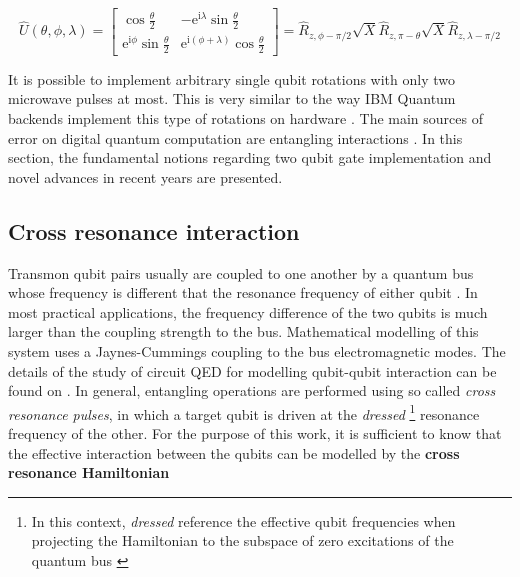   \begin{equation}
    \hat{U}(\theta, \phi, \lambda) = \begin{bmatrix}
      \cos{\frac{\theta}{2}} & -\mathrm{e}^{\mathrm{i}\lambda}\sin{\frac{\theta}{2}} \\
      \mathrm{e}^{\mathrm{i}\phi}\sin{\frac{\theta}{2}} & \mathrm{e}^{\mathrm{i}(\phi+\lambda)}\cos{\frac{\theta}{2}}
    \end{bmatrix}= \hat{R}_{z, \phi-\pi/2} \sqrt{X} \hat{R}_{z, \pi-\theta} \sqrt{X} \hat{R}_{z, \lambda-\pi/2} 
    \label{eq:qiskitGateImplement}
  \end{equation}

  It is possible to implement arbitrary single qubit rotations with only two microwave pulses at most. This is very similar to the way IBM Quantum backends implement this type of rotations on hardware \cite{Qiskit}. The main sources of error on digital quantum computation are entangling interactions \cite{HeisenbergSimulLasHeras}. In this section, the fundamental notions regarding two qubit gate implementation and novel advances in recent years are presented.

  \subsection{Cross resonance interaction}

  Transmon qubit pairs usually are coupled to one another by a quantum bus whose frequency is different that the resonance frequency of either qubit \cite{quantumEngineer, 2016RZXCalibration}. In most practical applications, the frequency difference of the two qubits is much larger than the coupling strength to the bus. Mathematical modelling of this system uses a Jaynes-Cummings coupling to the bus electromagnetic modes. The details of the study of circuit QED for modelling qubit-qubit interaction can be found on \cite{2020RZXHamiltonianModels}. In general, entangling operations are performed using so called \textit{cross resonance pulses}, in which a target qubit is driven at the \textit{dressed} \footnote{In this context, \textit{dressed} reference the effective qubit frequencies when projecting the Hamiltonian to the subspace of zero excitations of the quantum bus \cite{2020RZXHamiltonianModels}} resonance frequency of the other. For the purpose of this work, it is sufficient to know that the effective interaction between the qubits can be modelled by the \textbf{cross resonance Hamiltonian} \cite{DuplicatedRXZPulse, 2016RZXCalibration}

